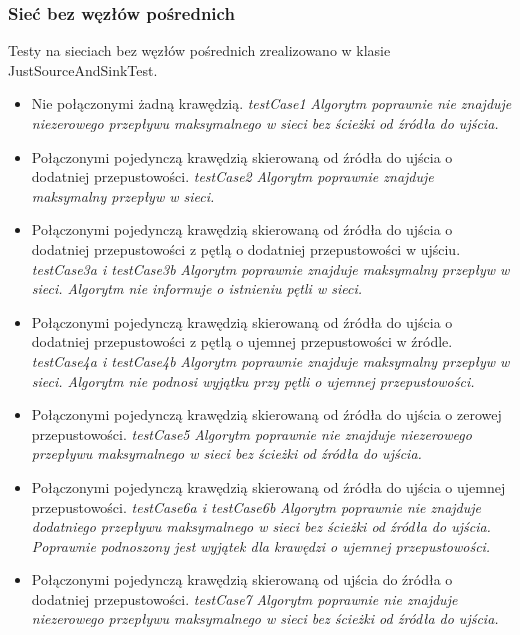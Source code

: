 \subsubsection{Sieć bez węzłów pośrednich}
Testy na sieciach bez węzłów pośrednich zrealizowano w klasie JustSourceAndSinkTest.
\begin{itemize}[nosep]
    \item Nie połączonymi żadną krawędzią.
    \emph{testCase1}
    \emph{Algorytm poprawnie nie znajduje niezerowego
    przepływu maksymalnego w sieci bez ścieżki od źródła do ujścia.}

    \item Połączonymi pojedynczą krawędzią skierowaną od źródła do ujścia o dodatniej przepustowości.
    \emph{testCase2}
    \emph{Algorytm poprawnie znajduje maksymalny przepływ w sieci.}

    \item Połączonymi pojedynczą krawędzią skierowaną od źródła do ujścia o dodatniej przepustowości z pętlą o dodatniej przepustowości w ujściu.
    \emph{testCase3a i testCase3b}
    \emph{Algorytm poprawnie znajduje maksymalny przepływ
    w sieci. Algorytm nie informuje o istnieniu pętli w sieci.}

    \item Połączonymi pojedynczą krawędzią skierowaną od źródła do ujścia o dodatniej przepustowości z pętlą o ujemnej przepustowości w źródle.
    \emph{testCase4a i testCase4b}
    \emph{Algorytm poprawnie znajduje maksymalny przepływ
    w sieci. Algorytm nie podnosi wyjątku przy pętli o ujemnej przepustowości.}

    \item Połączonymi pojedynczą krawędzią skierowaną od źródła do ujścia o zerowej przepustowości.
    \emph{testCase5}
    \emph{Algorytm poprawnie nie znajduje niezerowego przepływu
    maksymalnego w sieci bez ścieżki od źródła do ujścia.}

    \item Połączonymi pojedynczą krawędzią skierowaną od źródła do ujścia o ujemnej przepustowości.
    \emph{testCase6a i testCase6b}
    \emph{Algorytm poprawnie nie znajduje
    dodatniego przepływu maksymalnego w sieci bez ścieżki od źródła do ujścia. Poprawnie
    podnoszony jest wyjątek dla krawędzi o ujemnej przepustowości.}

    \item Połączonymi pojedynczą krawędzią skierowaną od ujścia do źródła o dodatniej przepustowości.
    \emph{testCase7}
    \emph{Algorytm poprawnie nie znajduje niezerowego
    przepływu maksymalnego w sieci bez ścieżki od źródła do ujścia.}


\end{itemize}
